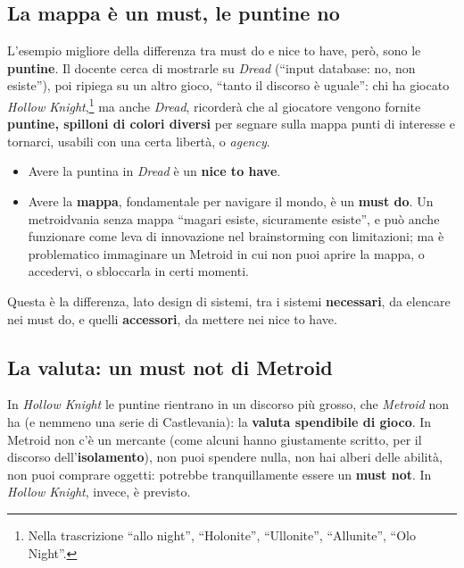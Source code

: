 \subsection{La mappa è un must, le puntine no}

L'esempio migliore della differenza tra must do e nice to have, però, sono
le \textbf{puntine}. Il docente cerca di mostrarle su \emph{Dread} (``input
database: no, non esiste''), poi ripiega su un altro gioco, ``tanto il
discorso è uguale'': chi ha giocato \emph{Hollow
Knight},\footnote{Nella trascrizione ``allo night'', ``Holonite'',
``Ullonite'', ``Allunite'', ``Olo Night''.} ma anche \emph{Dread}, ricorderà
che al giocatore vengono fornite \textbf{puntine, spilloni di colori
diversi} per segnare sulla mappa punti di interesse e tornarci, usabili con
una certa libertà, o \emph{agency}.
\begin{itemize}
  \item Avere la puntina in \emph{Dread} è un \textbf{nice to have}.
  \item Avere la \textbf{mappa}, fondamentale per navigare il mondo, è un
        \textbf{must do}. Un metroidvania senza mappa ``magari esiste,
        sicuramente esiste'', e può anche funzionare come leva di
        innovazione nel brainstorming con limitazioni; ma è problematico
        immaginare un Metroid in cui non puoi aprire la mappa, o accedervi,
        o sbloccarla in certi momenti.
\end{itemize}
Questa è la differenza, lato design di sistemi, tra i sistemi
\textbf{necessari}, da elencare nei must do, e quelli \textbf{accessori}, da
mettere nei nice to have.

\subsection{La valuta: un must not di Metroid}

In \emph{Hollow Knight} le puntine rientrano in un discorso più grosso, che
\emph{Metroid} non ha (e nemmeno una serie di Castlevania): la
\textbf{valuta spendibile di gioco}. In Metroid non c'è un mercante (come
alcuni hanno giustamente scritto, per il discorso dell'\textbf{isolamento}),
non puoi spendere nulla, non hai alberi delle abilità, non puoi comprare
oggetti: potrebbe tranquillamente essere un \textbf{must not}. In
\emph{Hollow Knight}, invece, è previsto.

